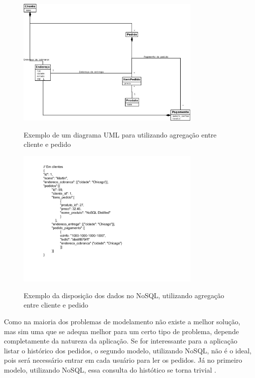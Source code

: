 \begin{figure}[H]
    \centering
    \caption{Exemplo de um diagrama \ac{UML} para utilizando agregação entre cliente e pedido}
    \includegraphics[width=0.8\textwidth]{./04-figuras/diagrama_no_sql_uml_duplo.jpg}
    \label{fig:diagrama_no_sql_uml_duplo}
\end{figure}
\begin{figure}[H]
    \centering
    \caption{Exemplo da disposição dos dados no NoSQL, utilizando agregação entre cliente e pedido}
    \includegraphics[width=0.8\textwidth]{./04-figuras/disposicao_json_duplo.png}
    \label{fig:disposicao_json_duplo}
\end{figure}

Como na maioria dos problemas de modelamento não existe a melhor solução, mas sim uma que se adequa melhor para um certo tipo de problema, depende completamente da natureza da aplicação. Se for interessante para a aplicação listar o histórico dos pedidos, o segundo modelo, utilizando NoSQL, não é o ideal, pois será necessário entrar em cada usuário para ler os pedidos. Já no primeiro modelo, utilizando NoSQL, essa consulta do histótico se torna trivial \cite{NoSQL}.

